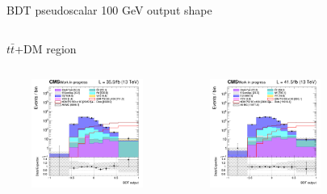 \documentclass[8pt]{beamer}
\begin{document}
\begin{frame}{BDT pseudoscalar 100 GeV output shape}
\vspace{-8pt}
\begin{columns}
\begin{column}{1.09\textwidth}
\begin{block}{\centering $t \bar t$+DM region}\end{block} \vspace{10pt}
\end{column}
\end{columns} \vspace{-16pt}
\begin{columns}
		\begin{column}{0.33\textwidth}
			\begin{center}
     			\includegraphics[width=1.0\textwidth, height=100pt]{figs/2016/SmearSR-ttDM-pseudo100/log_cratio_topCR_ll_TTbar_BDT_output_pseudoscalar100_customBinsAttempt7.png}
    		\end{center}		
		\end{column}
		\begin{column}{0.33\textwidth}
			\begin{center}
     			\includegraphics[width=1.0\textwidth, height=100pt]{figs/2017/SmearSR-ttDM-pseudo100/log_cratio_topCR_ll_TTbar_BDT_output_pseudoscalar100_customBinsAttempt7.png}
    		\end{center}		
		\end{column}
		\begin{column}{0.33\textwidth}
			\begin{center}

\end{center}
\end{column}
\end{columns}
\end{frame}
\end{document}
